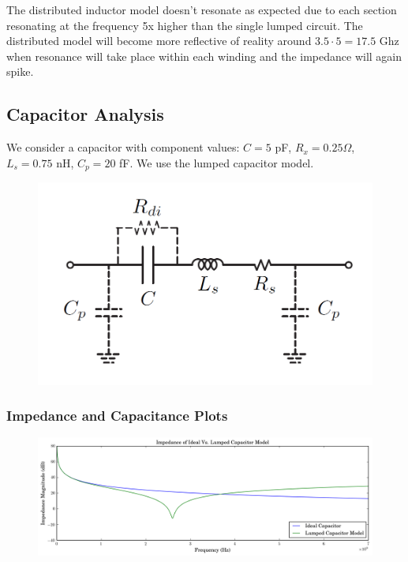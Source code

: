 \documentclass[11pt]{article}
\begin{document}
The distributed inductor model doesn't resonate as expected due to each section resonating at the frequency 5x higher than the single lumped circuit. The distributed model will become more reflective of reality around $3.5 \cdot 5 = 17.5$ Ghz when resonance will take place within each winding and the impedance will again spike.

\subsection{Capacitor Analysis}
We consider a capacitor with component values: $C = 5$ pF, $R_x = 0.25\Omega$, $L_s = 0.75$ nH, $C_p = 20$ fF. We use the lumped capacitor model.

\begin{figure}[H]
	\centering \includegraphics[width=\textwidth-8cm]{images/lumped_capacitor_model.png}
\end{figure}

\subsubsection{Impedance and Capacitance Plots}
\begin{figure}[H]
	\centering \includegraphics[width=\textwidth]{images/cap_impedance.png}
\end{figure}
\end{document}
